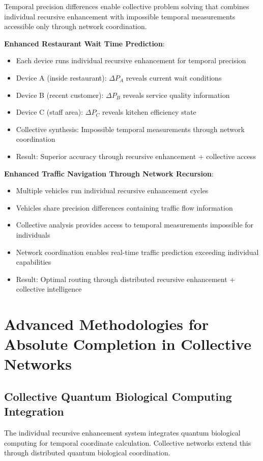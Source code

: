 \documentclass[12pt,a4paper]{article}
\begin{document}
Temporal precision differences enable collective problem solving that combines individual recursive enhancement with impossible temporal measurements accessible only through network coordination.

\textbf{Enhanced Restaurant Wait Time Prediction}:
\begin{itemize}
\item Each device runs individual recursive enhancement for temporal precision
\item Device A (inside restaurant): $\Delta P_A$ reveals current wait conditions
\item Device B (recent customer): $\Delta P_B$ reveals service quality information
\item Device C (staff area): $\Delta P_C$ reveals kitchen efficiency state
\item Collective synthesis: Impossible temporal measurements through network coordination
\item Result: Superior accuracy through recursive enhancement + collective access
\end{itemize}

\textbf{Enhanced Traffic Navigation Through Network Recursion}:
\begin{itemize}
\item Multiple vehicles run individual recursive enhancement cycles
\item Vehicles share precision differences containing traffic flow information
\item Collective analysis provides access to temporal measurements impossible for individuals
\item Network coordination enables real-time traffic prediction exceeding individual capabilities
\item Result: Optimal routing through distributed recursive enhancement + collective intelligence
\end{itemize}

\section{Advanced Methodologies for Absolute Completion in Collective Networks}

\subsection{Collective Quantum Biological Computing Integration}

The individual recursive enhancement system integrates quantum biological computing for temporal coordinate calculation. Collective networks extend this through distributed quantum biological coordination.
\end{document}
